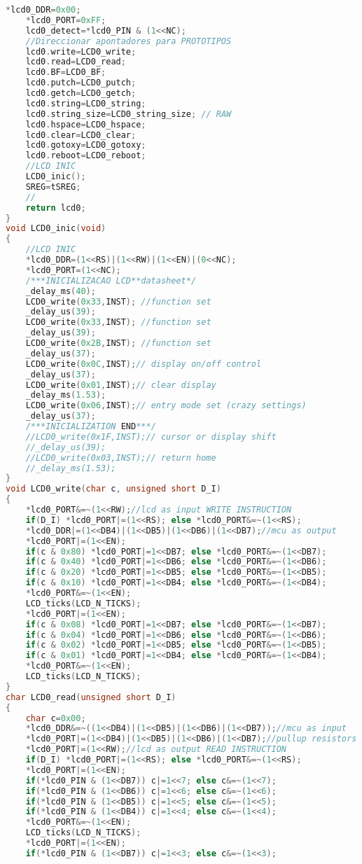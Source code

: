 \begin{lstlisting}[language=C, caption={lcd.c}, label=lcd-c, captionpos=b]
	*lcd0_DDR=0x00;
	*lcd0_PORT=0xFF;
	lcd0_detect=*lcd0_PIN & (1<<NC);
	//Direccionar apontadores para PROTOTIPOS
	lcd0.write=LCD0_write;
	lcd0.read=LCD0_read;
	lcd0.BF=LCD0_BF;
	lcd0.putch=LCD0_putch;
	lcd0.getch=LCD0_getch;
	lcd0.string=LCD0_string;
	lcd0.string_size=LCD0_string_size; // RAW
	lcd0.hspace=LCD0_hspace;
	lcd0.clear=LCD0_clear;
	lcd0.gotoxy=LCD0_gotoxy;
	lcd0.reboot=LCD0_reboot;
	//LCD INIC
	LCD0_inic();
	SREG=tSREG;
	//
	return lcd0;
}
void LCD0_inic(void)
{
	//LCD INIC
	*lcd0_DDR=(1<<RS)|(1<<RW)|(1<<EN)|(0<<NC);
	*lcd0_PORT=(1<<NC);
	/***INICIALIZACAO LCD**datasheet*/
	_delay_ms(40);
	LCD0_write(0x33,INST); //function set
	_delay_us(39);
	LCD0_write(0x33,INST); //function set
	_delay_us(39);
	LCD0_write(0x2B,INST); //function set
	_delay_us(37);
	LCD0_write(0x0C,INST);// display on/off control
	_delay_us(37);
	LCD0_write(0x01,INST);// clear display
	_delay_ms(1.53);
	LCD0_write(0x06,INST);// entry mode set (crazy settings)
	_delay_us(37);
	/***INICIALIZATION END***/
	//LCD0_write(0x1F,INST);// cursor or display shift
	//_delay_us(39);
	//LCD0_write(0x03,INST);// return home
	//_delay_ms(1.53);
}
void LCD0_write(char c, unsigned short D_I)
{
	*lcd0_PORT&=~(1<<RW);//lcd as input WRITE INSTRUCTION
	if(D_I) *lcd0_PORT|=(1<<RS); else *lcd0_PORT&=~(1<<RS);
	*lcd0_DDR|=(1<<DB4)|(1<<DB5)|(1<<DB6)|(1<<DB7);//mcu as output
	*lcd0_PORT|=(1<<EN);
	if(c & 0x80) *lcd0_PORT|=1<<DB7; else *lcd0_PORT&=~(1<<DB7);
	if(c & 0x40) *lcd0_PORT|=1<<DB6; else *lcd0_PORT&=~(1<<DB6);
	if(c & 0x20) *lcd0_PORT|=1<<DB5; else *lcd0_PORT&=~(1<<DB5);
	if(c & 0x10) *lcd0_PORT|=1<<DB4; else *lcd0_PORT&=~(1<<DB4);
	*lcd0_PORT&=~(1<<EN);
	LCD_ticks(LCD_N_TICKS);
	*lcd0_PORT|=(1<<EN);
	if(c & 0x08) *lcd0_PORT|=1<<DB7; else *lcd0_PORT&=~(1<<DB7);
	if(c & 0x04) *lcd0_PORT|=1<<DB6; else *lcd0_PORT&=~(1<<DB6);
	if(c & 0x02) *lcd0_PORT|=1<<DB5; else *lcd0_PORT&=~(1<<DB5);
	if(c & 0x01) *lcd0_PORT|=1<<DB4; else *lcd0_PORT&=~(1<<DB4);
	*lcd0_PORT&=~(1<<EN);
	LCD_ticks(LCD_N_TICKS);
}
char LCD0_read(unsigned short D_I)
{
	char c=0x00;
	*lcd0_DDR&=~((1<<DB4)|(1<<DB5)|(1<<DB6)|(1<<DB7));//mcu as input
	*lcd0_PORT|=(1<<DB4)|(1<<DB5)|(1<<DB6)|(1<<DB7);//pullup resistors
	*lcd0_PORT|=(1<<RW);//lcd as output READ INSTRUCTION
	if(D_I) *lcd0_PORT|=(1<<RS); else *lcd0_PORT&=~(1<<RS);
	*lcd0_PORT|=(1<<EN);
	if(*lcd0_PIN & (1<<DB7)) c|=1<<7; else c&=~(1<<7);
	if(*lcd0_PIN & (1<<DB6)) c|=1<<6; else c&=~(1<<6);
	if(*lcd0_PIN & (1<<DB5)) c|=1<<5; else c&=~(1<<5);
	if(*lcd0_PIN & (1<<DB4)) c|=1<<4; else c&=~(1<<4);
	*lcd0_PORT&=~(1<<EN);
	LCD_ticks(LCD_N_TICKS);
	*lcd0_PORT|=(1<<EN);
	if(*lcd0_PIN & (1<<DB7)) c|=1<<3; else c&=~(1<<3);

\end{lstlisting}
